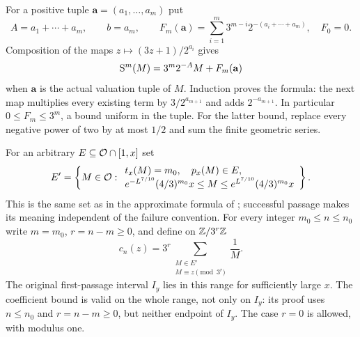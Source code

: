 For a positive tuple $\mathbf a=(a_1,\ldots,a_m)$ put
\[
 A=a_1+\cdots+a_m,\qquad b=a_m,\qquad
 F_m(\mathbf a)=\sum_{i=1}^m3^{m-i}2^{-(a_i+\cdots+a_m)},
 \quad F_0=0.
\]
Composition of the maps $z\mapsto(3z+1)/2^{a_i}$ gives
\begin{equation}\label{eq:affine}
 \mathrm S^m(M)=3^m2^{-A}M+F_m(\mathbf a)
\end{equation}
when $\mathbf a$ is the actual valuation tuple of $M$.
Induction proves the formula: the next map multiplies every existing term
by $3/2^{a_{m+1}}$ and adds $2^{-a_{m+1}}$.
In particular $0\leq F_m\leq3^m$, a bound uniform in the tuple.
For the latter bound, replace every negative power of two by at most
$1/2$ and sum the finite geometric series.

For an arbitrary $E\subseteq\mathcal O\cap[1,x]$ set
\[
 E'=\left\{M\in\mathcal O:\begin{array}{l}
 t_x(M)=m_0,\quad p_x(M)\in E,\\
 e^{-L^{7/10}}(4/3)^{m_0}x\leq M
       \leq e^{L^{7/10}}(4/3)^{m_0}x
 \end{array}\right\}.
\]
This is the same set as in the approximate formula of
\cite[Proposition 5.2]{Tao7}; successful passage makes its meaning
independent of the failure convention. For every integer $m_0\leq n\leq n_0$ write
$m=m_0$, $r=n-m\geq0$, and define on $\mathbb Z/3^r\mathbb Z$
\begin{equation}\label{eq:cn}
 c_n(z)=3^r\sum_{\substack{M\in E'\\M\equiv z\pmod{3^r}}}\frac1M.
\end{equation}
The original first-passage interval $I_y$ lies in this range for sufficiently
large $x$. The coefficient bound is valid on the whole range, not only on
$I_y$: its proof uses $n\leq n_0$ and $r=n-m\geq0$, but neither endpoint
of $I_y$. The case $r=0$ is allowed, with modulus one.

